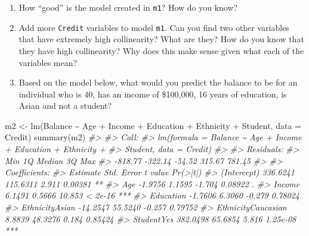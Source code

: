 \documentclass[
]{book}
\newenvironment{Shaded}{\begin{snugshade}}{\end{snugshade}}
\newcommand{\AttributeTok}[1]{\textcolor[rgb]{0.77,0.63,0.00}{#1}}
\newcommand{\CommentTok}[1]{\textcolor[rgb]{0.56,0.35,0.01}{\textit{#1}}}
\newcommand{\FunctionTok}[1]{\textcolor[rgb]{0.00,0.00,0.00}{#1}}
\newcommand{\NormalTok}[1]{#1}
\newcommand{\OtherTok}[1]{\textcolor[rgb]{0.56,0.35,0.01}{#1}}
\newcommand{\SpecialCharTok}[1]{\textcolor[rgb]{0.00,0.00,0.00}{#1}}
\providecommand{\tightlist}{%
  \setlength{\itemsep}{0pt}\setlength{\parskip}{0pt}}
\begin{document}
\begin{enumerate}
\def\labelenumi{\arabic{enumi}.}
\setcounter{enumi}{2}
\tightlist
\item
  How ``good'' is the model created in \texttt{m1}? How do you know?
\item
  Add more \texttt{Credit} variables to model \texttt{m1}. Can you find two other variables that have extremely high collinearity? What are they? How do you know that they have high collinearity? Why does this make sense given what each of the variables mean?
\item
  Based on the model below, what would you predict the balance to be for an individual who is 40, has an income of \$100,000, 16 years of education, is Asian and not a student?
\end{enumerate}

\begin{Shaded}
\begin{Highlighting}[]
\NormalTok{m2 }\OtherTok{\textless{}{-}} \FunctionTok{lm}\NormalTok{(Balance }\SpecialCharTok{\textasciitilde{}}\NormalTok{ Age }\SpecialCharTok{+}\NormalTok{ Income }\SpecialCharTok{+}\NormalTok{ Education }\SpecialCharTok{+}\NormalTok{ Ethnicity }\SpecialCharTok{+}\NormalTok{ Student, }\AttributeTok{data =}\NormalTok{ Credit)}
\FunctionTok{summary}\NormalTok{(m2)}
\CommentTok{\#\textgreater{} }
\CommentTok{\#\textgreater{} Call:}
\CommentTok{\#\textgreater{} lm(formula = Balance \textasciitilde{} Age + Income + Education + Ethnicity + }
\CommentTok{\#\textgreater{}     Student, data = Credit)}
\CommentTok{\#\textgreater{} }
\CommentTok{\#\textgreater{} Residuals:}
\CommentTok{\#\textgreater{}     Min      1Q  Median      3Q     Max }
\CommentTok{\#\textgreater{} {-}818.77 {-}322.14  {-}54.52  315.67  781.45 }
\CommentTok{\#\textgreater{} }
\CommentTok{\#\textgreater{} Coefficients:}
\CommentTok{\#\textgreater{}                    Estimate Std. Error t value Pr(\textgreater{}|t|)    }
\CommentTok{\#\textgreater{} (Intercept)        336.6241   115.6311   2.911  0.00381 ** }
\CommentTok{\#\textgreater{} Age                 {-}1.9756     1.1595  {-}1.704  0.08922 .  }
\CommentTok{\#\textgreater{} Income               6.1491     0.5666  10.853  \textless{} 2e{-}16 ***}
\CommentTok{\#\textgreater{} Education           {-}1.7606     6.3060  {-}0.279  0.78024    }
\CommentTok{\#\textgreater{} EthnicityAsian     {-}14.2547    55.5240  {-}0.257  0.79752    }
\CommentTok{\#\textgreater{} EthnicityCaucasian   8.8839    48.3276   0.184  0.85424    }
\CommentTok{\#\textgreater{} StudentYes         382.0498    65.6854   5.816 1.25e{-}08 ***}

\end{Highlighting}
\end{Shaded}
\end{document}
